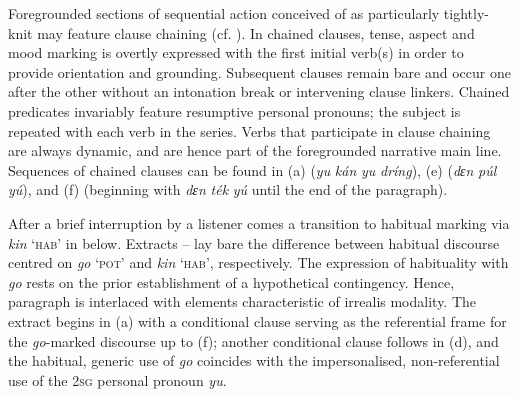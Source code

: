 \z
\z

Foregrounded sections of sequential action conceived of as particularly tightly-knit may feature clause chaining (cf. ). In chained clauses, tense, aspect and mood marking is overtly expressed with the first initial verb(s) in order to provide orientation and grounding. Subsequent clauses remain bare and occur one after the other without an intonation break or intervening clause linkers. Chained predicates invariably feature resumptive personal pronouns; the subject is repeated with each verb in the series. Verbs that participate in clause chaining are always dynamic, and are hence part of the foregrounded narrative main line. Sequences of chained clauses can be found in (a) (\textit{yu} \textit{kán} \textit{yu} \textit{dríng}), (e) (\textit{dɛn} \textit{púl} \textit{yú}), and (f) (beginning with \textit{dɛn} \textit{ték} \textit{yú} until the end of the paragraph).


After a brief interruption by a listener comes a transition to habitual marking via \textit{kin} ‘\textsc{hab}’ in  below. Extracts – lay bare the difference between habitual discourse centred on \textit{go} ‘\textsc{pot}’ and \textit{kin} ‘\textsc{hab}’, respectively. The expression of habituality with \textit{go} rests on the prior establishment of a hypothetical contingency. Hence, paragraph  is interlaced with elements characteristic of irrealis modality. The extract begins in (a) with a conditional clause serving as the referential frame for the \textit{go}{}-marked discourse up to (f); another conditional clause follows in (d), and the habitual, generic use of \textit{go} coincides with the impersonalised, non-referential use of the \textsc{2sg} personal pronoun \textit{yu}.



